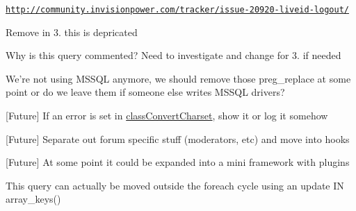 \begin{DoxyRefList}
\href{http://community.invisionpower.com/tracker/issue-20920-liveid-logout/}{\tt http\-://community.\-invisionpower.\-com/tracker/issue-\/20920-\/liveid-\/logout/} 
\item[\label{todo__todo000016}%
\hypertarget{todo__todo000016}{}%
Global \hyperlink{class_i_p_s_member_a1d880b0c0f0e06e766fa8a440cf2d76a}{I\-P\-S\-Member\-:\-:build\-Avatar} (\$member, \$no\-\_\-cache=0, \$over\-Ride=0)]Remove in 3. this is depricated 
\item[\label{todo__todo000015}%
\hypertarget{todo__todo000015}{}%
Global \hyperlink{class_i_p_s_member_a4a42a42a36b2afe41c5f106d8f6b1b0f}{I\-P\-S\-Member\-:\-:remove} (\$id, \$check\-\_\-admin=true)]Why is this query commented? Need to investigate and change for 3. if needed  
\item[\label{todo__todo000013}%
\hypertarget{todo__todo000013}{}%
Global \hyperlink{class_i_p_s_set_up_a9fafc14075ce91daa45361a825acf51e}{I\-P\-S\-Set\-Up\-:\-:add\-Prefix\-To\-Query} (\$query, \$prefix)]We're not using M\-S\-S\-Q\-L anymore, we should remove those preg\-\_\-replace at some point or do we leave them if someone else writes M\-S\-S\-Q\-L drivers?  
\item[\label{todo__todo000014}%
\hypertarget{todo__todo000014}{}%
Global \hyperlink{class_i_p_s_text_af768193cd55b4dd95baa70d8eb96a271}{I\-P\-S\-Text\-:\-:convert\-Charsets} (\$text, \$original\-\_\-cset, \$destination\-\_\-cset=\char`\"{}\-U\-T\-F-\/8\char`\"{})]\mbox{[}Future\mbox{]} If an error is set in \hyperlink{classclass_convert_charset}{class\-Convert\-Charset}, show it or log it somehow  
\item[\label{todo__todo000022}%
\hypertarget{todo__todo000022}{}%
Global \hyperlink{classmember_functions_a59163f75377087bd71ef19d0f4be6591}{member\-Functions\-:\-:update\-Name} (\$member\-\_\-id, \$name, \$field='members\-\_\-display\-\_\-name', \$discount=F\-A\-L\-S\-E)]\mbox{[}Future\mbox{]} Separate out forum specific stuff (moderators, etc) and move into hooks  
\item[\label{todo__todo000023}%
\hypertarget{todo__todo000023}{}%
Global \hyperlink{classmember_status_aea4ac1239c98262ef42af5fb1d4071ed}{member\-Status\-:\-:\-\_\-trigger\-External\-Updates} (\$updates, \$status\-\_\-id=0, \$author=null, \$content=null)]\mbox{[}Future\mbox{]} At some point it could be expanded into a mini framework with plugins  
\item[\label{todo__todo000012}%
\hypertarget{todo__todo000012}{}%
Global \hyperlink{classmessenger_functions_ae6c6e7834547e59357eaadc7e209443a}{messenger\-Functions\-:\-:send\-New\-Personal\-Topic} (\$to\-Member\-I\-D, \$from\-Member\-I\-D, \$invite\-Users, \$msg\-Title, \$msg\-Content, \$options=array())]This query can actually be moved outside the foreach cycle using an update I\-N array\-\_\-keys()  

\end{DoxyRefList}
